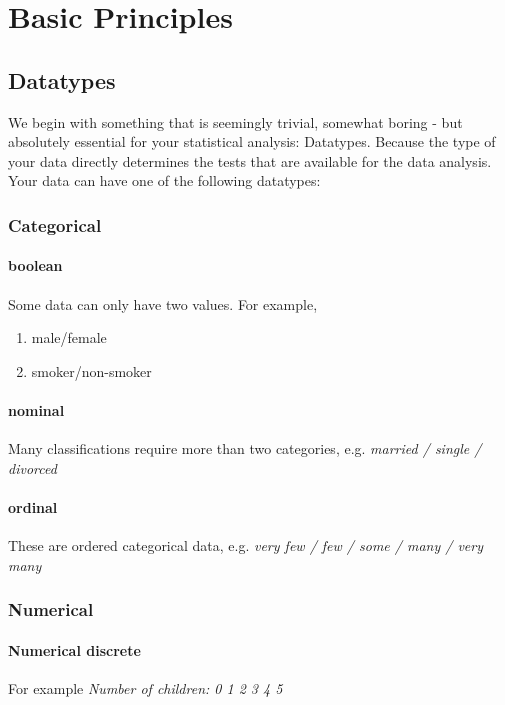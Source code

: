 \chapter{Basic Principles}

\section{Datatypes}

We begin with something that is seemingly trivial, somewhat boring - but absolutely essential for your statistical analysis: Datatypes. Because the type of your data directly determines the tests that are available for the data analysis. Your data can have one of the following datatypes:

\subsection{Categorical} 

\subsubsection{boolean}
Some data can only have two values. For example,
\begin{enumerate}
  \item male/female
  \item smoker/non-smoker
\end{enumerate}

\subsubsection{nominal}
Many classifications require more than two categories, e.g. \emph{married / single / divorced}

\subsubsection{ordinal}
These are ordered categorical data, e.g. \emph{very few / few / some / many / very many}

\subsection{Numerical}

\subsubsection{Numerical discrete}
For example \emph{Number of children: 0 1 2 3 4 5}

